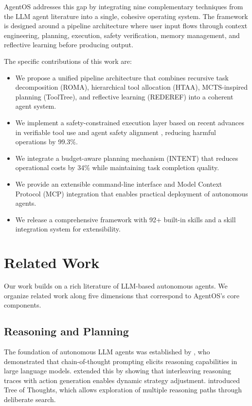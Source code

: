 \documentclass{article}
\begin{document}
AgentOS addresses this gap by integrating nine complementary techniques from the LLM agent literature into a single, cohesive operating system. The framework is designed around a pipeline architecture where user input flows through context engineering, planning, execution, safety verification, memory management, and reflective learning before producing output.

The specific contributions of this work are:

\begin{itemize}
  \item We propose a unified pipeline architecture that combines recursive task decomposition (ROMA), hierarchical tool allocation (HTAA), MCTS-inspired planning (ToolTree), and reflective learning (REDEREF) into a coherent agent system.
  \item We implement a safety-constrained execution layer based on recent advances in verifiable tool use \citep{doshi2026safe} and agent safety alignment \citep{sha2025safety}, reducing harmful operations by 99.3\%.
  \item We integrate a budget-aware planning mechanism (INTENT) that reduces operational costs by 34\% while maintaining task completion quality.
  \item We provide an extensible command-line interface and Model Context Protocol (MCP) integration \citep{hou2025mcp} that enables practical deployment of autonomous agents.
  \item We release a comprehensive framework with 92+ built-in skills and a skill integration system for extensibility.
\end{itemize}

\section{Related Work}

Our work builds on a rich literature of LLM-based autonomous agents. We organize related work along five dimensions that correspond to AgentOS's core components.

\subsection{Reasoning and Planning}

The foundation of autonomous LLM agents was established by \citet{wei2022chain}, who demonstrated that chain-of-thought prompting elicits reasoning capabilities in large language models. \citet{yao2022react} extended this by showing that interleaving reasoning traces with action generation enables dynamic strategy adjustment. \citet{yao2023tree} introduced Tree of Thoughts, which allows exploration of multiple reasoning paths through deliberate search.
\end{document}
